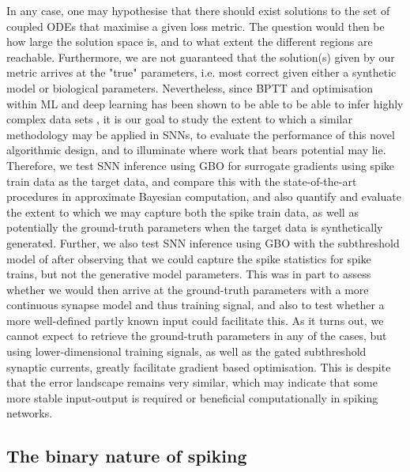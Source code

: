 \documentclass[mphil,deptreport,ianc]{infthesis} %
\begin{document}
In any case, one may hypothesise that there should exist solutions to the set of coupled ODEs that maximise a given loss metric. 
The question would then be how large the solution space is, and to what extent the different regions are reachable. 
Furthermore, we are not guaranteed that the solution(s) given by our metric arrives at the "true" parameters, i.e. most correct given either a synthetic model or biological parameters.
Nevertheless, since BPTT \cite{Rumelhart1986} and optimisation within ML and deep learning has been shown to be able to be able to infer highly complex data sets \cite{LeCun2015}, it is our goal to study the extent to which a similar methodology may be applied in SNNs, to evaluate the performance of this novel algorithmic design, and to illuminate where work that bears potential may lie.
Therefore, we test SNN inference using GBO for surrogate gradients using spike train data as the target data, and compare this with the state-of-the-art procedures in approximate Bayesian computation, and also quantify and evaluate the extent to which we may capture both the spike train data, as well as potentially the ground-truth parameters when the target data is synthetically generated.
Further, we also test SNN inference using GBO with the subthreshold model of \cite{Huh2018} after observing that we could capture the spike statistics for spike trains, but not the generative model parameters. This was in part to assess whether we would then arrive at the ground-truth parameters with a more continuous synapse model and thus training signal, and also to test whether a more well-defined partly known input could facilitate this.
As it turns out, we cannot expect to retrieve the ground-truth parameters in any of the cases, but using lower-dimensional training signals, as well as the gated subthreshold synaptic currents, greatly facilitate gradient based optimisation.
This is despite that the error landscape remains very similar, which may indicate that some more stable input-output is required or beneficial computationally in spiking networks.


\subsection*{The binary nature of spiking}
\end{document}
